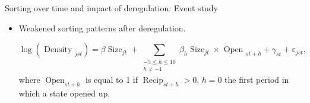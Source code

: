 \documentclass[notes,10pt, aspectratio=169]{beamer}
\begin{document}
    

        \begin{frame}{Sorting over time and impact of deregulation: Event study}
            \begin{itemize}
                \item Weakened sorting patterns after deregulation. %
    
            
            $$
            \log \left(\text { Density }_{j s t}\right)=\beta \operatorname{Size}_{j t}+\sum_{\substack{-5 \leq h \leq 10 \\ h \neq-1}} \beta_h \operatorname{Size}_{j t} \times \text { Open }_{s t+h}+\gamma_{s t}+\varepsilon_{j s t},
            $$
            where $\operatorname{Open}_{s t+h}$ is equal to 1 if $\operatorname{Recip}_{s t+h}>0$, $h=0$ the first period in which a state opened up.
        \end{itemize}
    

\end{frame}
\end{document}
